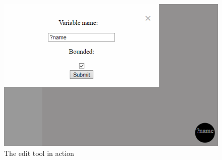 \begin{figure}[H]
    \centering
    \includegraphics[width=1\textwidth]{figures/edit-tool.pdf}
    \caption{The edit tool in action}
    \label{fig:edittool}
\end{figure}

